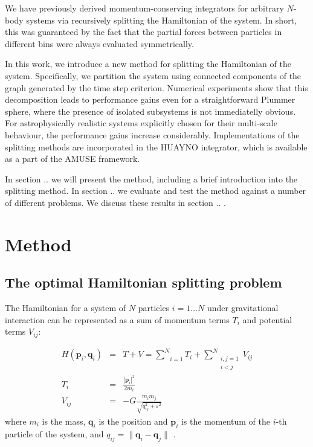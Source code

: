 \documentclass[referee]{aa}
\begin{document}
We have previously derived momentum-conserving integrators for arbitrary 
$N$-body systems via recursively splitting the Hamiltonian of the 
system\citep{Pelupessy:2012if}. In short, this was guaranteed by the fact that 
the partial forces between particles in different bins were always evaluated 
symmetrically.

In this work, we introduce a new method for splitting the Hamiltonian of 
the system. Specifically, we partition the system using connected 
components of the graph generated by the time step criterion. Numerical 
experiments show that this decomposition leads to performance gains even 
for a straightforward Plummer sphere, where the presence of isolated 
subsystems is not immediatelly obvious. For astrophysically realistic 
systems explicitly chosen for their multi-scale behaviour, the 
performance gains increase considerably. Implementations of the 
splitting methods are incorporated in the HUAYNO integrator, which is 
available as a part of the AMUSE framework.\cite {Pelupessy:2013tv}

In section .. we will present the method, including a brief introduction 
into the splitting method. In section .. we evaluate and test the method 
against a number of different problems. We discuss these results in 
section .. .

\section{Method}

\subsection{The optimal Hamiltonian splitting problem}

The Hamiltonian for a system of $N$ particles $i=1\ldots N$ under
gravitational interaction can be represented as a sum of momentum
terms $T_{i}$ and potential terms $V_{ij}$:

\begin{eqnarray*}
H(\mathbf{p}_{i},\mathbf{q}_{i}) & = & T+V=\underset{i=1}{\overset{N}{\sum}}T_{i}+\underset{\substack{i,j=1\\
i<j
}
}{\overset{N}{\sum}}V_{ij}\\
T_{i} & = & \frac{\left|\mathbf{p}_{i}\right|^{2}}{2m_{i}}\\
V_{ij} & = & -G\frac{m_{i}m_{j}}{\sqrt{q_{ij}^{2}+\varepsilon^{2}}}
\end{eqnarray*}
where $m_{i}$ is the mass, $\mathbf{q}_{i}$ is the position and
$\mathbf{p}_{i}$ is the momentum of the $i$-th particle of the system, and
$q_{ij} = \|\mathbf{q}_{i}-\mathbf{q}_{j} \|$ .
\end{document}
